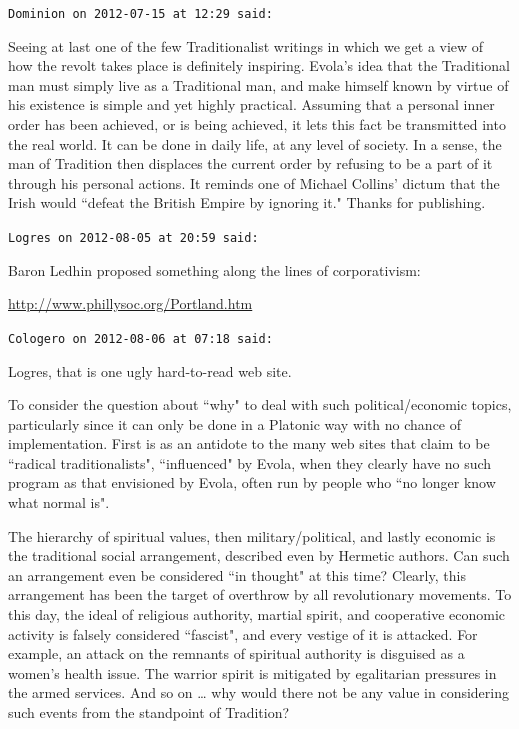 \begin{footnotesize}
\begin{sffamily}
\hfill

\texttt{Dominion on 2012-07-15 at 12:29 said: }

Seeing at last one of the few Traditionalist writings in which we get a view of how the revolt takes place is definitely inspiring. Evola's idea that the Traditional man must simply live as a Traditional man, and make himself known by virtue of his existence is simple and yet highly practical. Assuming that a personal inner order has been achieved, or is being achieved, it lets this fact be transmitted into the real world. It can be done in daily life, at any level of society. In a sense, the man of Tradition then displaces the current order by refusing to be a part of it through his personal actions. It reminds one of Michael Collins' dictum that the Irish would ``defeat the British Empire by ignoring it." Thanks for publishing.


\hfill

\texttt{Logres on 2012-08-05 at 20:59 said: }

Baron Ledhin proposed something along the lines of corporativism:

\url{http://www.phillysoc.org/Portland.htm}


\hfill

\texttt{Cologero on 2012-08-06 at 07:18 said: }

Logres, that is one ugly hard-to-read web site.

To consider the question about ``why" to deal with such political/economic topics, particularly since it can only be done in a Platonic way with no chance of implementation. First is as an antidote to the many web sites that claim to be ``radical traditionalists", ``influenced" by Evola, when they clearly have no such program as that envisioned by Evola, often run by people who ``no longer know what normal is".

The hierarchy of spiritual values, then military/political, and lastly economic is the traditional social arrangement, described even by Hermetic authors. Can such an arrangement even be considered ``in thought" at this time? Clearly, this arrangement has been the target of overthrow by all revolutionary movements. To this day, the ideal of religious authority, martial spirit, and cooperative economic activity is falsely considered ``fascist", and every vestige of it is attacked. For example, an attack on the remnants of spiritual authority is disguised as a women's health issue. The warrior spirit is mitigated by egalitarian pressures in the armed services. And so on … why would there not be any value in considering such events from the standpoint of Tradition?



\end{sffamily}
\end{footnotesize}
